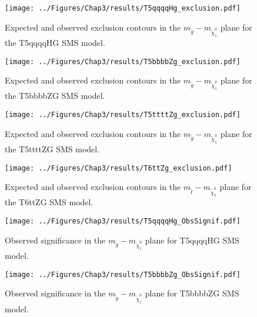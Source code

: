 \begin{figure}[h]
\centering
\texttt{[image: ../Figures/Chap3/results/T5qqqqHg\_exclusion.pdf]}
\caption{Expected and observed exclusion contours in the $m_{\tilde{g}}-m_{\tilde{\chi}_{1}^{0}}$ plane for the T5qqqqHG SMS model.}
\label{fig:T5qqqqExclusion}
\end{figure}

\begin{figure}[h]
\centering
\texttt{[image: ../Figures/Chap3/results/T5bbbbZg\_exclusion.pdf]}
\caption{Expected and observed exclusion contours in the $m_{\tilde{g}}-m_{\tilde{\chi}_{1}^{0}}$ plane for the T5bbbbZG SMS model.}
\label{fig:T5bbbbExclusion}
\end{figure}

\begin{figure}[h]
\centering
\texttt{[image: ../Figures/Chap3/results/T5ttttZg\_exclusion.pdf]}
\caption{Expected and observed exclusion contours in the $m_{\tilde{g}}-m_{\tilde{\chi}_{1}^{0}}$ plane for the T5ttttZG SMS model.}
\label{fig:T5ttttExclusion}
\end{figure}

\begin{figure}[h]
\centering
\texttt{[image: ../Figures/Chap3/results/T6ttZg\_exclusion.pdf]}
\caption{Expected and observed exclusion contours in the $m_{\tilde{t}}-m_{\tilde{\chi}_{1}^{0}}$ plane for the T6ttZG SMS model.}
\label{fig:T6ttExclusion}
\end{figure}


\begin{figure}[h]
\centering
\texttt{[image: ../Figures/Chap3/results/T5qqqqHg\_ObsSignif.pdf]}
\caption{Observed significance in the $m_{\tilde{g}}-m_{\tilde{\chi}_{1}^{0}}$ plane for 
 T5qqqqHG SMS model.}
\label{fig:T5qqqqSignficance}
\end{figure}

\begin{figure}[h]
\centering
\texttt{[image: ../Figures/Chap3/results/T5bbbbZg\_ObsSignif.pdf]}
\caption{Observed significance in the $m_{\tilde{g}}-m_{\tilde{\chi}_{1}^{0}}$ plane for
 T5bbbbZG SMS model.}
\label{fig:T5bbbbSignficance}
\end{figure}

